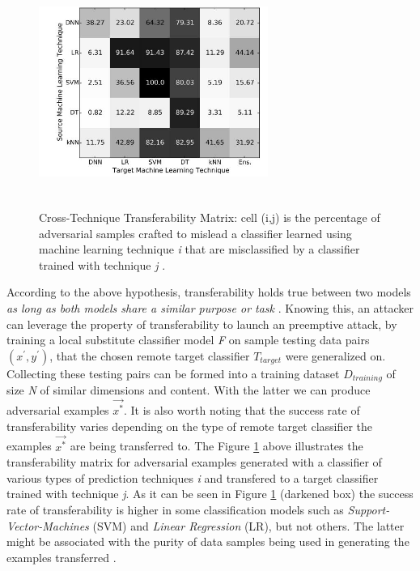 \documentclass[grad,lot,lof,11pt,oneside,onehalfspace]{RUthesis}
\begin{document}
 \begin{figure}[h]
 	\centering
 	\includegraphics[width=7.5cm, height=7.5cm]{"Images/Chapter 2/SuccessRateAdversary"}
 	\caption{Cross-Technique Transferability Matrix:  cell (i,j) is the percentage of adversarial samples crafted to mislead a classifier learned using machine learning technique \textit{i} that are misclassified by a classifier trained with technique \textit{j} \cite{papernot_transferability_2016}.}
 	\label{fig:SuccessRateAdversary}
 \end{figure}
 According to the above hypothesis, transferability holds true between two models \textit{as long as both models share a similar purpose or task} \cite{papernot_transferability_2016}. Knowing this, an attacker can leverage the property of transferability to launch an preemptive attack, by training a local substitute classifier model \textit{F} on sample testing data pairs \textit{$(x^{'},y^{'})$}, that the chosen remote target classifier \textit{$T_{target}$} were generalized on. Collecting these testing pairs can be formed into a training dataset \textit{$D_{training}$} of size \textit{N} of similar dimensions and content. With the latter we can produce adversarial examples \textit{$\vec{x^{*}}$}. It is also worth noting that the success rate of transferability varies depending on the type of remote target classifier the examples \textit{$\vec{x^{*}}$} are being transferred to. The Figure \ref{fig:SuccessRateAdversary} above \cite{hosseini_blocking_2017} illustrates the transferability matrix for adversarial examples generated with a classifier of various types of prediction techniques \textit{i} and transfered to a target classifier trained with technique \textit{j}. As it can be seen in Figure \ref{fig:SuccessRateAdversary} (darkened box) the success rate of transferability is higher in some classification models such as \textit{Support-Vector-Machines} (SVM) and \textit{Linear Regression} (LR), but not others. The latter might be associated with the purity of data samples being used in generating the examples transferred \cite{hosseini_blocking_2017}.  
\end{document}
